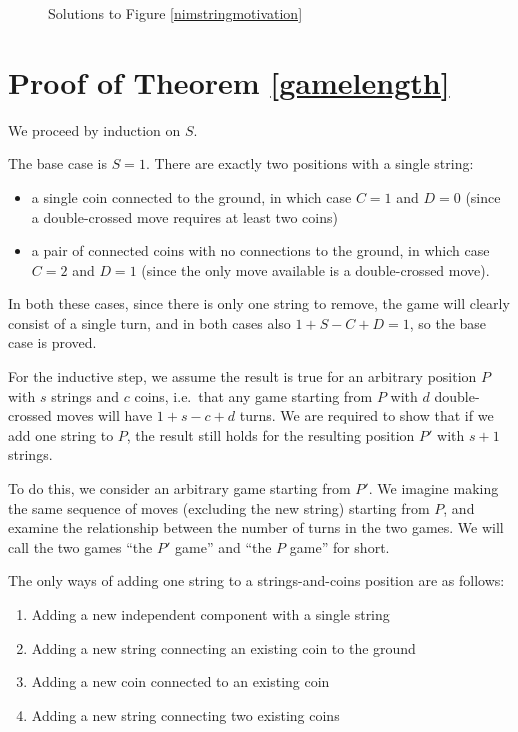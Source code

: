 \documentclass[a4paper,twocolumn]{article}
\begin{document}
\begin{figure}
  \centering
  \def\svgscale{0.7}
  
  \caption{Solutions to Figure \ref{nimstringmotivation}}
  \label{nimstringmotivationsolution}
\end{figure}

\appendix

\section{Proof of Theorem \ref{gamelength}}\label{gamelengthproof}

We proceed by induction on $S$.

The base case is $S=1$. There are exactly two positions with a
single string:

\begin{itemize}
  \item a single coin connected to the ground, in which case $C=1$ and
    $D=0$ (since a double-crossed move requires at least two coins)
  \item a pair of connected coins with no connections to the ground,
    in which case $C=2$ and $D=1$ (since the only move available is
    a double-crossed move).
\end{itemize}

In both these cases, since there is only one string to remove, the
game will clearly consist of a single turn, and in both cases also
$1+S-C+D = 1$, so the base case is proved.

For the inductive step, we assume the result is true for an
arbitrary position $P$ with $s$ strings and $c$ coins, i.e.\ that any
game starting from $P$ with $d$ double-crossed moves will have
$1+s-c+d$ turns. We are required to show that if we add one string
to $P$, the result still holds for the resulting position $P'$ with
$s+1$ strings.

To do this, we consider an arbitrary game starting from $P'$. We
imagine making the same sequence of moves (excluding the new string)
starting from $P$, and examine the relationship between the number
of turns in the two games. We will call the two games ``the $P'$
game'' and ``the $P$ game'' for short.

The only ways of adding one string to a strings-and-coins position
are as follows:

\begin{enumerate}
  \item Adding a new independent component with a single string
  \item Adding a new string connecting an existing coin to the
    ground
  \item Adding a new coin connected to an existing coin
  \item Adding a new string connecting two existing coins
\end{enumerate}
\end{document}
